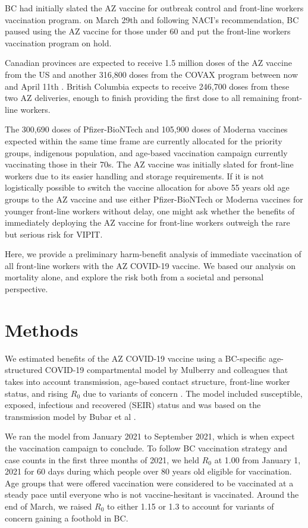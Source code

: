 \documentclass[]{interact}
\theoremstyle{plain}%
\theoremstyle{definition}
\theoremstyle{remark}
\begin{document}
BC had initially slated the AZ vaccine for outbreak control and
front-line workers vaccination program. on March 29th and following
NACI's recommendation, BC paused using the AZ vaccine for those under 60
and put the front-line workers vaccination program on hold.

Canadian provinces are expected to receive 1.5 million doses of the AZ
vaccine from the US and another 316,800 doses from the COVAX program
between now and April 11th \citep{government_of_canada_vaccines_2021}.
British Columbia expects to receive 246,700 doses from these two AZ
deliveries, enough to finish providing the first dose to all remaining
front-line workers.

The 300,690 doses of Pfizer-BioNTech and 105,900 doses of Moderna
vaccines expected within the same time frame are currently allocated for
the priority groups, indigenous population, and age-based vaccination
campaign currently vaccinating those in their 70s. The AZ vaccine was
initially slated for front-line workers due to its easier handling and
storage requirements. If it is not logistically possible to switch the
vaccine allocation for above 55 years old age groups to the AZ vaccine
and use either Pfizer-BioNTech or Moderna vaccines for younger
front-line workers without delay, one might ask whether the benefits of
immediately deploying the AZ vaccine for front-line workers outweigh the
rare but serious risk for VIPIT.

Here, we provide a preliminary harm-benefit analysis of immediate
vaccination of all front-line workers with the AZ COVID-19 vaccine. We
based our analysis on mortality alone, and explore the risk both from a
societal and personal perspective.

\hypertarget{methods}{%
\section{Methods}\label{methods}}

We estimated benefits of the AZ COVID-19 vaccine using a BC-specific
age-structured COVID-19 compartmental model by Mulberry and colleagues
that takes into account transmission, age-based contact structure,
front-line worker status, and rising \(R_0\) due to variants of concern
\citep{mulberry_vaccine_2021}. The model included susceptible, exposed,
infectious and recovered (SEIR) status and was based on the transmission
model by Bubar et al \citep{bubar_model-informed_2021}.

We ran the model from January 2021 to September 2021, which is when
expect the vaccination campaign to conclude. To follow BC vaccination
strategy and case counts in the first three months of 2021, we held
\(R_0\) at 1.00 from January 1, 2021 for 60 days during which people
over 80 years old eligible for vaccination. Age groups that were offered
vaccination were considered to be vaccinated at a steady pace until
everyone who is not vaccine-hesitant is vaccinated. Around the end of
March, we raised \(R_0\) to either 1.15 or 1.3 to account for variants
of concern gaining a foothold in BC.
\end{document}
